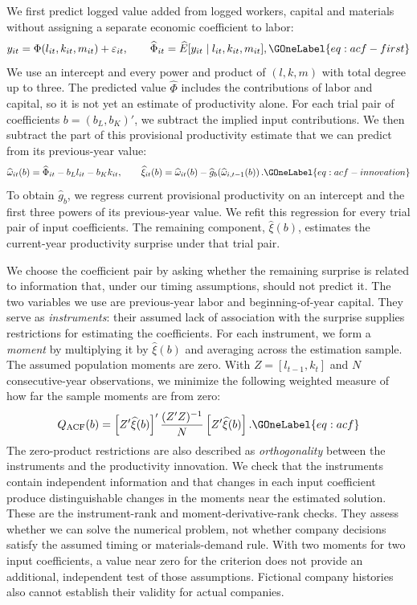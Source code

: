 We first predict logged value added from logged workers, capital and materials without assigning a separate economic coefficient to labor:
\begin{equation}
y_{it}=\Phi(l_{it},k_{it},m_{it})+\varepsilon_{it},\qquad
\widehat\Phi_{it}=\widehat E[y_{it}\mid l_{it},k_{it},m_{it}],
\GOneLabel{eq:acf-first}
\end{equation}
We use an intercept and every power and product of $(l,k,m)$ with total degree up to three. The predicted value $\widehat\Phi$ includes the contributions of labor and capital, so it is not yet an estimate of productivity alone. For each trial pair of coefficients $b=(b_L,b_K)'$, we subtract the implied input contributions. We then subtract the part of this provisional productivity estimate that we can predict from its previous-year value:
\begin{equation}
\widehat\omega_{it}(b)=\widehat\Phi_{it}-b_Ll_{it}-b_Kk_{it},\qquad
\widehat\xi_{it}(b)=\widehat\omega_{it}(b)-\widehat g_b\!\left(\widehat\omega_{i,t-1}(b)\right).
\GOneLabel{eq:acf-innovation}
\end{equation}
To obtain $\widehat g_b$, we regress current provisional productivity on an intercept and the first three powers of its previous-year value. We refit this regression for every trial pair of input coefficients. The remaining component, $\widehat\xi(b)$, estimates the current-year productivity surprise under that trial pair.

We choose the coefficient pair by asking whether the remaining surprise is related to information that, under our timing assumptions, should not predict it. The two variables we use are previous-year labor and beginning-of-year capital. They serve as \emph{instruments}: their assumed lack of association with the surprise supplies restrictions for estimating the coefficients. For each instrument, we form a \emph{moment} by multiplying it by $\widehat\xi(b)$ and averaging across the estimation sample. The assumed population moments are zero. With $Z=[l_{t-1},k_t]$ and $N$ consecutive-year observations, we minimize the following weighted measure of how far the sample moments are from zero:
\begin{equation}
Q_{\mathrm{ACF}}(b)=\left[Z'\widehat\xi(b)\right]'
\frac{(Z'Z)^{-1}}{N}\left[Z'\widehat\xi(b)\right].
\GOneLabel{eq:acf}
\end{equation}
The zero-product restrictions are also described as \emph{orthogonality} between the instruments and the productivity innovation. We check that the instruments contain independent information and that changes in each input coefficient produce distinguishable changes in the moments near the estimated solution. These are the instrument-rank and moment-derivative-rank checks. They assess whether we can solve the numerical problem, not whether company decisions satisfy the assumed timing or materials-demand rule. With two moments for two input coefficients, a value near zero for the criterion does not provide an additional, independent test of those assumptions. Fictional company histories also cannot establish their validity for actual companies.

